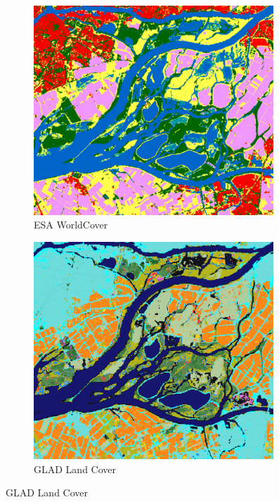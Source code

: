 \begin{figure}[H]
    \centering
    \begin{subfigure}[b]{0.48\textwidth} %
    \centering
    \includegraphics[width=0.99\textwidth,height=0.99\textwidth]{figs_01/a_worldcover.png}
    \caption{ESA WorldCover}
    \label{fig:lc_worldcover}
    \end{subfigure}
    \hfill %
    \begin{subfigure}[b]{0.48\textwidth} %
    \centering
    \includegraphics[width=0.99\textwidth,height=0.99\textwidth]{figs_01/a_glad.png}
    \caption{GLAD Land Cover}
    \label{fig:lc_glad}
    \end{subfigure}
    

\end{figure}
